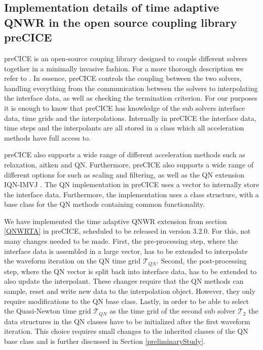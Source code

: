 \subsection{Implementation details of time adaptive QNWR in the open source coupling library preCICE}\label{implementationDetail}

preCICE is an open-source couping library designed to couple different solvers together in a minimally invasive fashion. For a more thorough description we refer to \cite{ChDa22}. In essence, preCICE controls the coupling between the two solvers, handling everything from the communication between the solvers to interpolating the interface data, as well as checking the termination criterion. For our purposes it is enough to know that preCICE has knowledge of the sub solvers interface data, time grids and the interpolations. Internally in preCICE the interface data, time steps and the interpolants are all stored in a class which all acceleration methods have full access to. 

preCICE also supports a wide range of different acceleration methods such as relaxation, aitken and QN. Furthermore, preCICE also supports a wide range of different options for such as scaling and filtering, as well as the QN extension IQN-IMVJ \cite{SchUe15}. The QN implementation in preCICE uses a vector to internally store the interface data. Furthermore, the implementation uses a class structure, with a base class for the QN methods containing common functionality.

We have implemented the time adaptive QNWR extension from section \ref{QNWRTA} in preCICE, scheduled to be released in version 3.2.0. For this, not many changes needed to be made. First, the pre-processing step, where the interface data is assembled in a large vector, has to be extended to interpolate the waveform iteration on the QN time grid $\mathcal{T}_{QN}$. Second, the post-processing step, where the QN vector is split back into interface data, has to be extended to also update the interpolant. These changes require that the QN methods can sample, reset and write new data to the interpolation object. However, they only require modifications to the QN base class. Lastly, in order to be able to select the Quasi-Newton time grid $\mathcal{T}_{QN}$ as the time grid of the second sub solver $\mathcal{T}_2$ the data structures in the QN classes have to be initialized after the first waveform iteration. This choice requires small changes to the inherited classes of the QN base class and is further discussed in Section \ref{preliminaryStudy}. 

